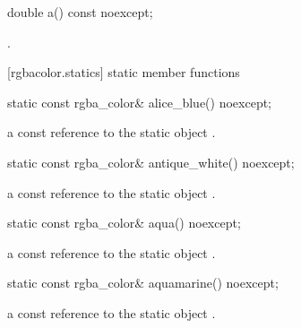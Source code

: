 \begin{itemdecl}
	double a() const noexcept;
\end{itemdecl}
\begin{itemdescr}
	\pnum
	\returns
	.
\end{itemdescr}

 [rgbacolor.statics] { static member functions}

\begin{itemdecl}
    static const rgba_color& alice_blue() noexcept;
\end{itemdecl}
\begin{itemdescr}
    \pnum
    \returns
    a const reference to the static  object .
\end{itemdescr}

\begin{itemdecl}
    static const rgba_color& antique_white() noexcept;
\end{itemdecl}
\begin{itemdescr}
    \pnum
    \returns
    a const reference to the static  object .
\end{itemdescr}

\begin{itemdecl}
    static const rgba_color& aqua() noexcept;
\end{itemdecl}
\begin{itemdescr}
    \pnum
    \returns
    a const reference to the static  object .
\end{itemdescr}

\begin{itemdecl}
    static const rgba_color& aquamarine() noexcept;
\end{itemdecl}
\begin{itemdescr}
    \pnum
    \returns
    a const reference to the static  object .
\end{itemdescr}

